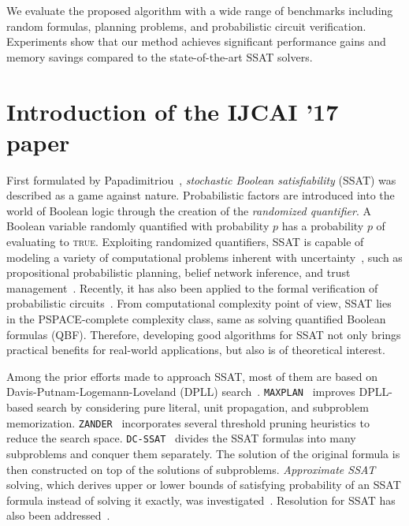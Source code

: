     We evaluate the proposed algorithm with a wide range of benchmarks including random formulas,
    planning problems, and probabilistic circuit verification.
    Experiments show that our method achieves significant performance gains and memory savings compared to the state-of-the-art SSAT solvers.

    \section{Introduction of the IJCAI '17 paper}
    First formulated by Papadimitriou~\cite{Papadimitriou1985}, \textit{stochastic Boolean satisfiability} (SSAT) was described as a game against nature.
    Probabilistic factors are introduced into the world of Boolean logic through the creation of the \textit{randomized quantifier}.
    A Boolean variable randomly quantified with probability $p$ has a probability $p$ of evaluating to \textsc{true}.
    Exploiting randomized quantifiers, SSAT is capable of modeling a variety of computational problems inherent with uncertainty~\cite{Hnich2011}, such as propositional probabilistic planning, belief network inference, and trust management~\cite{SATHandbook-SSAT}.
    Recently, it has also been applied to the formal verification of probabilistic circuits~\cite{LeeTC18ProbDesign}.
    From computational complexity point of view, SSAT lies in the PSPACE-complete complexity class, same as solving quantified Boolean formulas (QBF).
    Therefore, developing good algorithms for SSAT not only brings practical benefits for real-world applications, but also is of theoretical interest.

    Among the prior efforts made to approach SSAT, most of them are based on Davis-Putnam-Logemann-Loveland (DPLL) search~\cite{Davis1962}.
    \texttt{MAXPLAN}~\cite{Majercik1998} improves DPLL-based search by considering pure literal, unit propagation, and subproblem memorization.
    \texttt{ZANDER}~\cite{Majercik2003} incorporates several threshold pruning heuristics to reduce the search space.
    \texttt{DC-SSAT}~\cite{Majercik2005} divides the SSAT formulas into many subproblems and conquer them separately.
    The solution of the original formula is then constructed on top of the solutions of subproblems.
    \textit{Approximate SSAT} solving, which derives upper or lower bounds of satisfying probability of an SSAT formula instead of solving it exactly, was investigated~\cite{Majercik2007}.
    Resolution for SSAT has also been addressed~\cite{Teige2010}.


